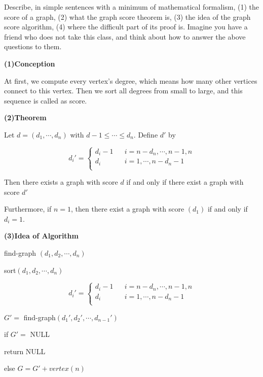 \begin{exercise}
  Describe, in simple sentences with a minimum of mathematical formalism, (1) the score
  of a graph, (2) what the graph score theorem is, (3) the idea of the 
  graph score algorithm, (4) where the difficult part of its proof is.
  Imagine you have a friend who does not take this class, and think about how to answer
  the above questions to them.
\end{exercise} 


\textbf{(1)Conception}
\par At first, we compute every vertex's degree, which means how many other vertices connect to this vertex. Then we sort all degrees from small to large, and this sequence is called as score.
\par
\textbf{(2)Theorem}
\par Let $d=(d_1,\cdots,d_n)$ with $d-1\le\cdots\le d_n$. Define $d'$ by
\begin{center}
$$ d_i'=\left\{
\begin{array}{rcl}
d_i-1       &      & {i=n-d_n,\cdots,n-1,n}\\
d_i         &      & {i=1,\cdots,n-d_n-1}\\
\end{array} \right. $$
\end{center}
\par Then there exists a graph with score $d$ if and only if there exist a graph with score $d'$
\par Furthermore, if $n=1$, then there exist a graph with score $(d_1)$ if and only if $d_i=1$.
\par
\textbf{(3)Idea of Algorithm}
\par find-graph $(d_1,d_2,\cdots,d_n)$
\par sort$(d_1,d_2,\cdots,d_n)$
\begin{center}
$$ d_i'=\left\{
\begin{array}{rcl}
d_i-1       &      & {i=n-d_n,\cdots,n-1,n}\\
d_i         &      & {i=1,\cdots,n-d_n-1}\\
\end{array} \right. $$
\end{center}
\par $G'=$ find-graph$(d_1',d_2',\cdots,d_{n-1}')$
\par if $G'=$ NULL
\par return NULL
\par else $G=G'+vertex(n)$
